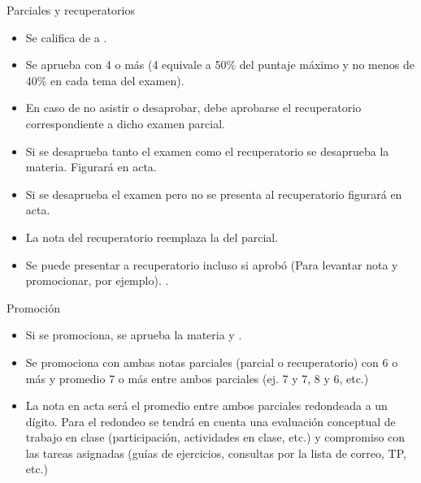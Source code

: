 \begin{frame}{Parciales y recuperatorios}
  \begin{itemize}
    \item Se califica de  a .
    \item Se aprueba con 4 o más (4 equivale a 50\% del puntaje máximo y no menos
      de 40\% en cada tema del examen).
    \item En caso de no asistir o desaprobar, debe aprobarse el recuperatorio 
      correspondiente a dicho examen parcial.
    \item Si se desaprueba tanto el examen como el recuperatorio se desaprueba la
      materia. Figurará  en acta.
    \item Si se desaprueba el examen pero no se presenta al recuperatorio figurará
       en acta.
    \item La nota del recuperatorio reemplaza la del parcial.
    \item Se puede presentar a recuperatorio incluso si aprobó (Para levantar
      nota y promocionar, por ejemplo). .
  \end{itemize}
\end{frame}


\begin{frame}{Promoción}
  \begin{itemize}
    \item Si se promociona, se aprueba la materia y .
    \item Se promociona con ambas notas parciales (parcial o recuperatorio) con
      6 o más y promedio 7 o más entre ambos parciales (ej. 7 y 7, 8 y 6, etc.)
    \item La nota en acta será el promedio entre ambos parciales redondeada a un 
      dígito. Para el redondeo se tendrá en cuenta una evaluación conceptual de 
      trabajo en clase (participación, actividades en clase, etc.) y compromiso
      con las tareas asignadas (guías de ejercicios, consultas por la lista de
      correo, TP, etc.)
  \end{itemize}
\end{frame}


